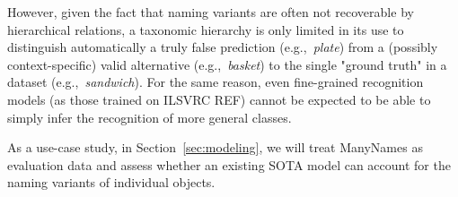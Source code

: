 %
%
%
However, given the fact that naming variants are often not recoverable by hierarchical relations, a taxonomic hierarchy is only limited in its use to distinguish automatically a truly false prediction (e.g.,\ \textsl{plate}) from a (possibly context-specific) valid alternative (e.g.,\ \textsl{basket}) to the single "ground truth" in a dataset (e.g.,\ \textsl{sandwich}). 
For the same reason, even fine-grained recognition models (as those trained on ILSVRC REF) cannot be expected to be able to simply infer the recognition of more general classes.
%

%

%
As a use-case study, in Section\ \ref{sec:modeling}, we will treat ManyNames as evaluation data and assess whether an existing SOTA model can account for the naming variants of individual objects. 

